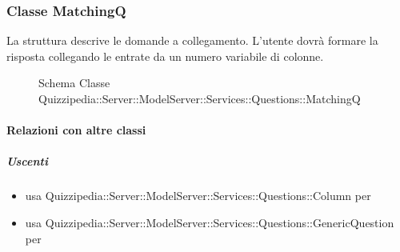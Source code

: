 \subsubsection{Classe MatchingQ}
La struttura descrive le domande a collegamento. L'utente dovrà formare la risposta collegando le entrate da un numero variabile di colonne.
\begin{figure}[H]
\centering
\noindent{}
\caption[Schema Classe MatchingQ]{Schema Classe Quizzipedia::Server::ModelServer::Services::Questions::MatchingQ}
\end{figure}
\paragraph{Relazioni con altre classi}
\subparagraph{Uscenti}
\begin{itemize}
\item usa Quizzipedia::Server::ModelServer::Services::Questions::Column per 
\item usa Quizzipedia::Server::ModelServer::Services::Questions::GenericQuestion per 
\end{itemize}
